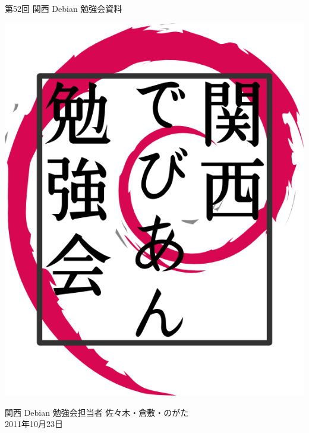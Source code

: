 \documentclass[mingoth,a4paper]{jsarticle}
\newcommand{\debmtgyear}{2011}
\newcommand{\debmtgmonth}{10}
\newcommand{\debmtgdate}{23}
\newcommand{\debmtgnumber}{52}
\begin{document}
\begin{titlepage}


 第\debmtgnumber{}回 関西 Debian 勉強会資料

\vspace{2cm}

\begin{center}
\includegraphics{image200802/kansaidebianlogo.png}
\end{center}

\begin{flushright}
\hfill{}関西 Debian 勉強会担当者 佐々木・倉敷・のがた \\
\hfill{}\debmtgyear{}年\debmtgmonth{}月\debmtgdate{}日
\end{flushright}

\thispagestyle{empty}
\end{titlepage}


\subsection*{}%
\end{document}
